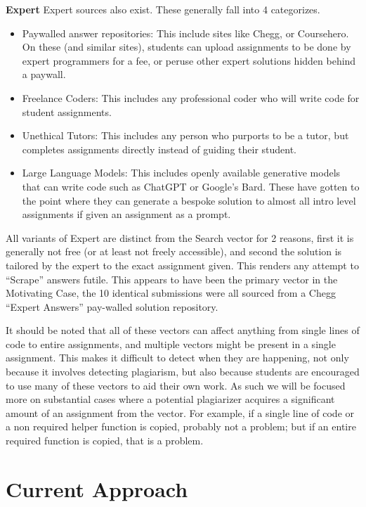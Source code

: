 \documentclass[10pt]{article}
\newcommand{\n}{\hfill\break}
\begin{document}
	 \n\noindent\textbf{Expert} Expert sources also exist.  These generally fall into 4 categorizes.
	\begin{itemize}
	\item Paywalled answer repositories:  This include sites like Chegg, or Coursehero.  On these (and similar sites), students can upload assignments to be done by expert programmers for a fee, or peruse other expert solutions hidden behind a paywall.  
	\item Freelance Coders: This includes any professional coder who will write code for student assignments.
	\item Unethical Tutors: This includes any person who purports to be a tutor, but completes assignments directly instead of guiding their student.
	\item Large Language Models:  This includes openly available generative models that can write code such as ChatGPT or Google's Bard.  These have gotten to the point where they can generate a bespoke solution to almost all intro level assignments if given an assignment as a prompt.
	
	
	\end{itemize} 
	All variants of Expert are distinct from the Search vector for 2 reasons, first it is generally not free (or at least not freely accessible), and second the solution is tailored by the expert to the exact assignment given.  This renders any attempt to ``Scrape'' answers futile.
	This appears to have been the primary vector in the Motivating Case, the 10 identical submissions were all sourced from a Chegg ``Expert Answers'' pay-walled solution repository.

\n\indent
 It should be noted that all of these vectors can affect anything from single lines of code to entire assignments, and multiple vectors might be present in a single assignment.
	This makes it difficult to detect when they are happening, not only because it involves detecting plagiarism, but also because students are encouraged to use many of these vectors to aid their own work.  As such we will be focused more on substantial cases where a potential plagiarizer acquires a significant amount of an assignment from the vector.  For example, if a single line of code or a non required helper function is copied, probably not a problem; but if an entire required function is copied, that is a problem.
\section{Current Approach}
\end{document}
